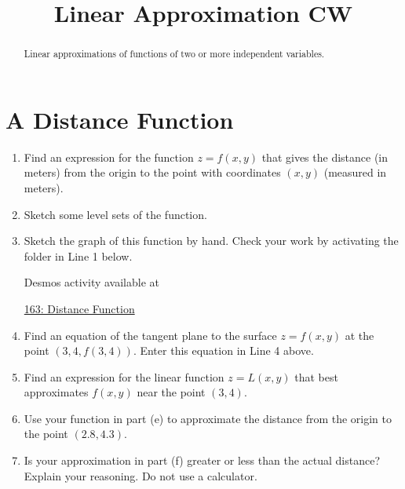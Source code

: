 \documentclass{ximera}
\title{Linear Approximation CW}
\begin{document}
\begin{abstract}
Linear approximations of functions of two or more independent variables.
\end{abstract}
\maketitle


\section{A Distance Function}

\begin{question} \label{QLf3rfds444f}
 
\begin{enumerate}

\item Find an expression for the function $z=f(x,y)$ that gives the distance (in meters) from the origin to the point with coordinates $(x,y)$ (measured in meters).

\item Sketch some level sets of the function.

\item Sketch the graph of this function by hand. Check your work by activating the folder in Line 1 below.

\begin{onlineOnly}
    \begin{center}
\end{center}
\end{onlineOnly}

Desmos activity available at

\href{https://www.desmos.com/3d/vsrw96fijo}{163: Distance Function}

\item Find an equation of the tangent plane to the surface $z=f(x,y)$ at the point $(3,4,f(3,4))$. Enter this equation in Line 4 above.

\item Find an expression for the linear function $z=L(x,y)$ that best approximates $f(x,y)$ near the point $(3,4)$.

\item Use your function in part (e) to approximate the distance from the origin to the point $(2.8, 4.3)$.

\item Is  your approximation in part (f) greater or less than the actual distance? Explain your reasoning. Do not use a calculator.


\end{enumerate}
\end{question}
\end{document}
